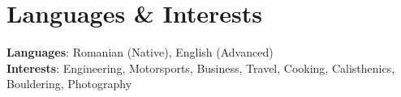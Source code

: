 \documentclass[letterpaper,11pt]{article}
\begin{document}
\section{Languages \& Interests}
\begin{itemize}[leftmargin=0.15in, label={}]
  \small{\item{
        \textbf{Languages}{: Romanian (Native), English (Advanced)} \\
        \textbf{Interests}{: Engineering, Motorsports, Business, Travel, Cooking, Calisthenics, Bouldering, Photography}
        }}
\end{itemize}

\end{document}
